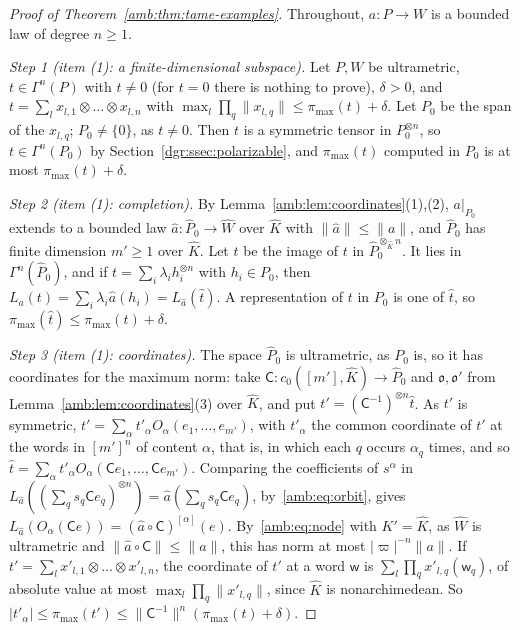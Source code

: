 \documentclass[11pt]{amsart}
\theoremstyle{definition}
\theoremstyle{remark}
\numberwithin{equation}{section}
\newcommand{\abs}[1]{\lvert #1\rvert}
\newcommand{\norm}[1]{\lVert #1\rVert}
\newcommand{\Kh}{\widehat K}
\theoremstyle{plain}
\theoremstyle{definition}
\theoremstyle{plain}
\begin{document}
\begin{proof}[Proof of Theorem~\ref{amb:thm:tame-examples}]
Throughout, $a\colon P\to W$ is a bounded law of degree $n\ge1$.

\emph{Step 1 (item (1): a finite-dimensional subspace).} Let $P,W$ be ultrametric, $t\in\Gamma^n(P)$ with $t\ne0$ (for $t=0$ there is nothing to prove), $\delta>0$, and
$t=\sum_lx_{l,1}\otimes\dots\otimes x_{l,n}$ with $\max_l\prod_q\norm{x_{l,q}}\le\pi_{\max}(t)+\delta$. Let $P_0$ be the span
of the $x_{l,q}$; $P_0\ne\{0\}$, as $t\ne0$. Then $t$ is a symmetric tensor in $P_0^{\otimes n}$, so $t\in\Gamma^n(P_0)$ by
Section~\ref{dgr:ssec:polarizable}, and $\pi_{\max}(t)$ computed in $P_0$ is at most $\pi_{\max}(t)+\delta$.

\emph{Step 2 (item (1): completion).} By Lemma~\ref{amb:lem:coordinates}(1),(2), $a|_{P_0}$ extends to a bounded law
$\hat a\colon\widehat P_0\to\widehat W$ over $\Kh$ with $\norm{\hat a}\le\norm a$, and $\widehat P_0$ has finite dimension
$m'\ge1$ over $\Kh$. Let $\hat t$ be the image of $t$ in $\widehat P_0^{\otimes_{\Kh}n}$. It lies in $\Gamma^n(\widehat P_0)$,
and if $t=\sum_i\lambda_ih_i^{\otimes n}$ with $h_i\in P_0$, then $L_a(t)=\sum_i\lambda_i\hat a(h_i)=L_{\hat a}(\hat t)$. A
representation of $t$ in $P_0$ is one of $\hat t$, so $\pi_{\max}(\hat t)\le\pi_{\max}(t)+\delta$.

\emph{Step 3 (item (1): coordinates).} The space $\widehat P_0$ is ultrametric, as $P_0$ is, so it has coordinates for the maximum norm: take $\mathsf C\colon
c_0([m'],\Kh)\to\widehat P_0$ and $\mathfrak o,\mathfrak o'$ from Lemma~\ref{amb:lem:coordinates}(3) over $\Kh$, and put
$t'=(\mathsf C^{-1})^{\otimes n}\hat t$. As $t'$ is symmetric, $t'=\sum_\alpha t'_\alpha O_\alpha(e_1,\dots,e_{m'})$, with
$t'_\alpha$ the common coordinate of $t'$ at the words in $[m']^n$ of content $\alpha$, that is, in which each $q$ occurs $\alpha_q$ times, and so
$\hat t=\sum_\alpha t'_\alpha O_\alpha(\mathsf Ce_1,\dots,\mathsf Ce_{m'})$. Comparing the coefficients of $s^\alpha$ in
$L_{\hat a}((\sum_qs_q\mathsf Ce_q)^{\otimes n})=\hat a(\sum_qs_q\mathsf Ce_q)$, by~\eqref{amb:eq:orbit}, gives
$L_{\hat a}(O_\alpha(\mathsf Ce))=(\hat a\circ\mathsf C)^{[\alpha]}(e)$. By~\eqref{amb:eq:node} with $K'=\Kh$, as $\widehat W$ is ultrametric and
$\norm{\hat a\circ\mathsf C}\le\norm a$, this has norm at most $\abs\varpi^{-n}\norm a$. If
$t'=\sum_lx'_{l,1}\otimes\dots\otimes x'_{l,n}$, the coordinate of $t'$ at a word $\mathsf w$ is
$\sum_l\prod_qx'_{l,q}(\mathsf w_q)$, of absolute value at most $\max_l\prod_q\norm{x'_{l,q}}$, since $\Kh$ is
nonarchimedean. So $\abs{t'_\alpha}\le\pi_{\max}(t')\le\norm{\mathsf C^{-1}}^n(\pi_{\max}(t)+\delta)$.


\end{proof}
\end{document}
